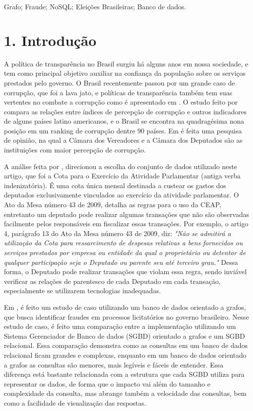 \documentclass[12pt]{article}
\begin{document}
\begin{palavraschave} 
Grafo; Fraude; NoSQL; Eleições Brasileiras; Banco de dados.
\end{palavraschave}

\section{1. Introdução} \label{sec:intro}
	A política de transparência no Brasil surgiu há alguns anos em nossa sociedade, e tem como principal objetivo auxiliar na confiança da população sobre os serviços prestados pelo governo. O Brasil recentemente passou por um grande caso de corrupção, que foi a lava jato, e políticas de transparência também tem suas vertentes no combate a corrupção como é apresentado em \cite{diirrcombate}. O estudo feito por \cite{abramo2000relaccoes} compara as relações entre índices de percepção de corrupção
e outros indicadores de alguns países latino americanos, e o Brasil se encontra na quadragésima nona posição em um ranking de corrupção dentre 90 países. Em \cite{filgueiras2009tolerancia} é feita uma pesquisa de opinião, na qual a Câmara dos Vereadores e a Câmara dos Deputados são as instituições com maior percepção de
corrupção.

	A análise feita por \cite{filgueiras2009tolerancia}, direcionou a escolha do conjunto de dados utilizado neste artigo, que foi a Cota para o Exercício da Atividade Parlamentar (antiga verba indenizatória). É uma cota única mensal destinada a custear os gastos dos deputados exclusivamente vinculados ao exercício da atividade parlamentar. O Ato da Mesa número 43 de 2009, detalha as regras para o uso da CEAP, entretanto um deputado pode realizar algumas transações que não são observadas facilmente pelos responsáveis em fiscalizar essas transações. Por exemplo, o artigo 4, parágrafo 13 do Ato da Mesa número 43 de 2009, diz: \textit{"Não se admitirá a utilização da Cota para ressarcimento de despesas relativas a bens fornecidos ou serviços prestados por empresa ou entidade da qual o proprietário ou detentor de qualquer participação seja o Deputado ou parente seu até terceiro grau."} Dessa forma, o Deputado pode realizar transações que violam essa regra, sendo inviável verificar as relações de parentesco de cada Deputado em cada transação, especialmente se utilizarem tecnologias inadequadas.
	
	Em \cite{van2017graph}, é feito um estudo de caso utilizando um banco de dados orientado a grafos, que busca identificar fraudes em processos licitatórios no governo brasileiro. Nesse estudo de caso, é feito uma comparação entre a implementação utilizando um Sistema Gerenciador de Banco de dados (SGBD) orientado a grafos e um SGBD relacional. Essa comparação demonstra como as consultas em um banco de dados relacional ficam grandes e complexas, enquanto em um banco de dados orientado a grafos as consultas são menores, mais legíveis e fáceis de entender. Essa diferença está bastante relacionada com a estrutura que cada SGBD utiliza para representar os dados, de forma que o impacto vai além do tamanho e complexidade da consulta, mas abrange também a velocidade das consultas, bem como a facilidade de visualização das respostas.
\end{document}
